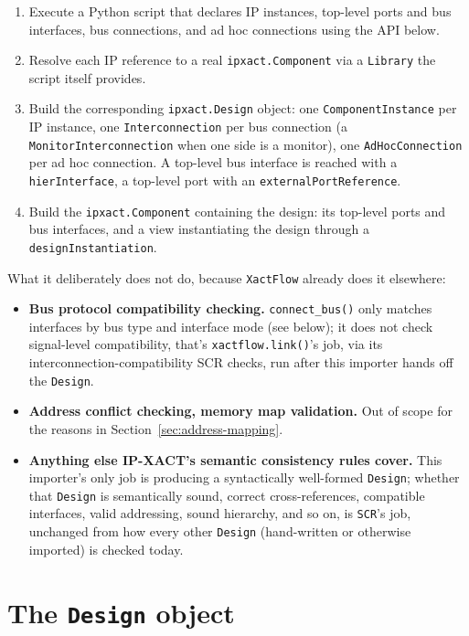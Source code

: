 \documentclass[11pt]{article}
\newcommand{\code}[1]{\texttt{#1}}
\begin{document}
\begin{enumerate}
    \item Execute a Python script that declares IP instances, top-level ports and bus
    interfaces, bus connections, and ad hoc connections using the API below.
    \item Resolve each IP reference to a real \code{ipxact.Component} via a
    \code{Library} the script itself provides.
    \item Build the corresponding \code{ipxact.Design} object: one
    \code{ComponentInstance} per IP instance, one \code{Interconnection} per bus
    connection (a \code{MonitorInterconnection} when one side is a monitor), one
    \code{AdHocConnection} per ad hoc connection. A top-level bus interface is reached
    with a \code{hierInterface}, a top-level port with an \code{externalPortReference}.
    \item Build the \code{ipxact.Component} containing the design: its top-level ports and
    bus interfaces, and a view instantiating the design through a
    \code{designInstantiation}.
\end{enumerate}

What it deliberately does not do, because \code{XactFlow} already does it elsewhere:

\begin{itemize}
    \item \textbf{Bus protocol compatibility checking.} \code{connect\_bus()} only
    matches interfaces by bus type and interface mode (see below); it does not
    check signal-level compatibility, that's \code{xactflow.link()}'s job, via its
    interconnection-compatibility SCR checks, run after this importer hands off the
    \code{Design}.
    \item \textbf{Address conflict checking, memory map validation.} Out of scope for the
    reasons in Section~\ref{sec:address-mapping}.
    \item \textbf{Anything else IP-XACT's semantic consistency rules cover.} This
    importer's only job is producing a syntactically well-formed \code{Design}; whether
    that \code{Design} is semantically sound, correct cross-references, compatible
    interfaces, valid addressing, sound hierarchy, and so on, is \code{SCR}'s job,
    unchanged from how every other \code{Design} (hand-written or otherwise imported) is
    checked today.
\end{itemize}

\section{The \texttt{Design} object}
\end{document}
